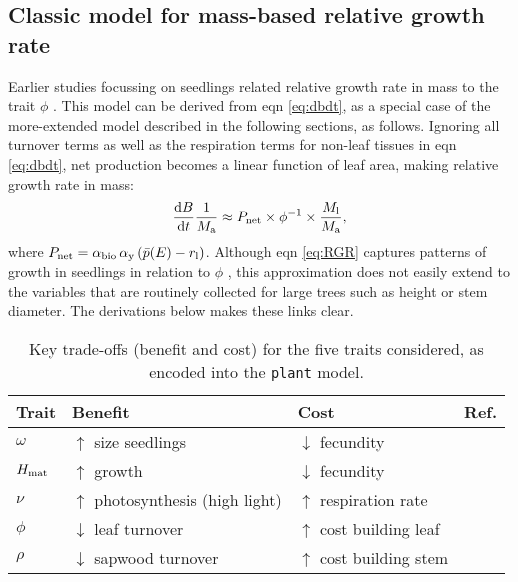 \documentclass[9pt,twocolumn,twoside]{pnas-new}
\newcommand{\plant}{\texttt{plant}}
\begin{document}
\subsection{Classic model for mass-based relative growth rate}

Earlier studies focussing on seedlings related relative growth rate in mass to the trait $\phi$ \citep{Blackman-1919, Lambers-1992, Cornelissen-1996, Wright-2000}. This model can be derived from eqn \ref{eq:dbdt}, as a special case of the more-extended model described in the following sections, as follows. Ignoring all turnover terms as well as the respiration terms for non-leaf tissues in eqn \ref{eq:dbdt}, net production becomes a linear function of leaf area, making relative growth rate in mass:
\begin{equation}\label{eq:RGR}
\frac{{\rm d}B}{{\rm d}t}\frac{1}{M_{\rm a}}  \approx P_{\rm net} \times \phi^{-1} \times \frac{M_{\rm l}}{M_{\rm a}}, \end{equation}
where $P_{\rm net} = \alpha_{\rm bio} \, \alpha_{\rm y}\,(\bar{p}(E) - r_{\rm l})$. Although eqn \ref{eq:RGR} captures patterns of growth in seedlings in relation to $\phi$ \citep{Wright-2000}, this approximation does not easily extend to the variables that are routinely collected for large trees such as height or stem diameter. The derivations below makes these links clear.

\begin{table}[t]
 \caption{Key trade-offs (benefit and cost) for the five traits considered, as encoded into the {\plant} model.
 }
\centering
  \begin{tabular}{p{0.5cm}p{3.25cm}p{2.25cm}p{1cm}}
  \toprule
  Trait &  Benefit & Cost & Ref. \\
  \midrule
  $\omega$ & $\uparrow$ size seedlings & $\downarrow$ fecundity & \citep{Moles-2006}\\
  $H_{{\rm mat}}$  & $\uparrow$ growth & $\downarrow$ fecundity & \citep{Thomas-2011, Wenk-2015}\\
  $\nu$ & $\uparrow$ photosynthesis (high light) & $\uparrow$ respiration rate & \citep{Wright-2004}\\
  $\phi$ & $\downarrow$ leaf turnover & $\uparrow$ cost building leaf & \citep{Wright-2004}\\
  $\rho$ & $\downarrow$ sapwood turnover & $\uparrow$ cost building stem & \citep{Chave-2009}\\
  \bottomrule
  \end{tabular}
\label{tab:traits}
\end{table}
\end{document}
